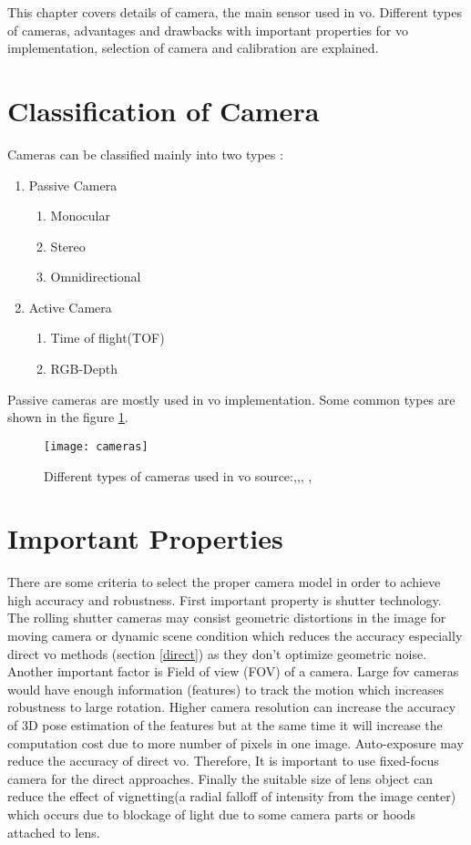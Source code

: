 This chapter covers details of camera, the main sensor used in \acrshort{vo}. Different types of cameras, advantages and drawbacks with important properties for \acrshort{vo} implementation, selection of camera and calibration are explained. 

\section{Classification of Camera}
Cameras can be classified mainly into two types :
\begin{enumerate}
	\item Passive Camera
	\begin{enumerate}
		\item Monocular
		\item Stereo
		\item Omnidirectional
	\end{enumerate}
	\item Active Camera
	\begin{enumerate}
		\item Time of flight(TOF)
		\item RGB-Depth
	\end{enumerate}
\end{enumerate}
Passive cameras are mostly used in \acrshort{vo} implementation. Some common types are shown in the figure \ref{fig:cameras}.
\begin{figure}[h]
	\centering
	\texttt{[image: cameras]}
	\caption{Different types of cameras used in \acrshort{vo} source:\cite{ids},\cite{kinect},\cite{zed}, \cite{omni},\cite{tof}}
	\label{fig:cameras}
\end{figure}


\section{Important Properties}
There are some criteria to select the proper camera model in order to achieve high accuracy and robustness. First important property is shutter technology. The rolling shutter cameras may consist geometric distortions in the image for moving camera or dynamic scene condition which reduces the accuracy especially direct \acrshort{vo} methods (section \ref{direct}) as they don't optimize geometric noise. Another important factor is Field of view (FOV) of a camera. Large \acrshort{fov} cameras would have enough information (features) to track the motion which increases robustness to large rotation. Higher camera resolution can increase the accuracy of 3D pose estimation of the features but at the same time it will increase the computation cost due to more number of pixels in one image. Auto-exposure may reduce the accuracy of direct \acrshort{vo}. Therefore, It is important to use fixed-focus camera for the direct approaches. Finally the suitable size of lens object can reduce the effect of vignetting(a radial falloff of intensity from the image center) \cite{vignette} which occurs due to blockage of light due to some camera parts or hoods attached to lens.

